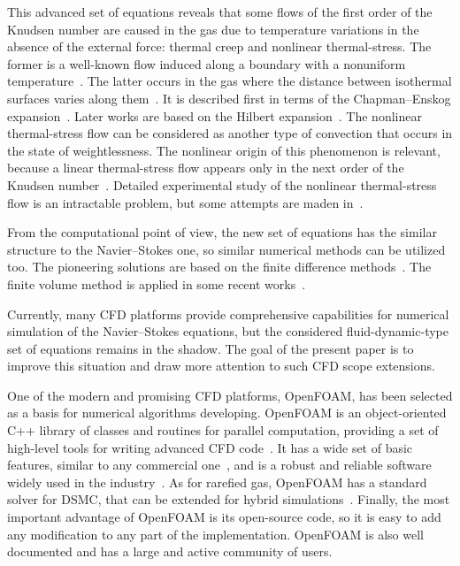 \documentclass[smallextended, referee]{svjour3} %
\begin{document}
This advanced set of equations reveals that some flows of the first order of the Knudsen number
are caused in the gas due to temperature variations in the absence of the external force:
thermal creep and nonlinear thermal-stress. The former is a well-known flow induced along a boundary
with a nonuniform temperature~\cite{Maxwell1879Stresses, Ohwada1989Creep}.
The latter occurs in the gas where the distance between isothermal surfaces varies along them~\cite{Kogan1976}.
It is described first in terms of the Chapman--Enskog expansion~\cite{Kogan1971}.
Later works are based on the Hilbert expansion~\cite{SoneBobylev96}.
The nonlinear thermal-stress flow can be considered as another type of convection
that occurs in the state of weightlessness.
The nonlinear origin of this phenomenon is relevant, because a linear thermal-stress flow
appears only in the next order of the Knudsen number~\cite{Sone1972Stress}.
Detailed experimental study of the nonlinear thermal-stress flow is an intractable problem,
but some attempts are maden in~\cite{ExperimentsNTFS2003}.

From the computational point of view, the new set of equations has the similar structure
to the Navier--Stokes one, so similar numerical methods can be utilized too.
The pioneering solutions are based on the finite difference
methods~\cite{SoneBobylev96, Aleksandrov2002Tube, Aleksandrov2008Particle}.
The finite volume method is applied in some recent works~\cite{Laneryd2006, Laneryd2007}.

Currently, many CFD platforms provide comprehensive
capabilities for numerical simulation of the Navier--Stokes equations,
but the considered fluid-dynamic-type set of equations remains in the shadow.
The goal of the present paper is to improve this situation and
draw more attention to such CFD scope extensions.

One of the modern and promising CFD platforms, OpenFOAM\textregistered{},
has been selected as a basis for numerical algorithms developing.
OpenFOAM\textregistered{} is an object-oriented C++ library of classes and routines for parallel computation,
providing a set of high-level tools for writing advanced CFD code~\cite{OpenFOAM1998}.
It has a wide set of basic features, similar to any commercial one~\cite{OpenFOAM2010},
and is a robust and reliable software widely used in the industry~\cite{BoilingFlows2009,
TurbulentCombustion2011, CoastalEngineering2013, BiomassPyrolysis2013}.
As for rarefied gas, OpenFOAM\textregistered{} has a standard solver for DSMC, that
can be extended for hybrid simulations~\cite{HybridSolver2014}.
Finally, the most important advantage of OpenFOAM\textregistered{} is its open-source code,
so it is easy to add any modification to any part of the implementation.
OpenFOAM\textregistered{} is also well documented and has a large and active community of users.
\end{document}
